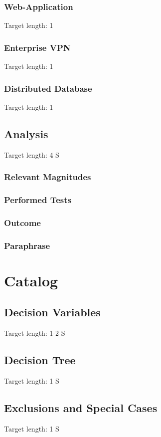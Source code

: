 \documentclass[MSC,Master,english]{twbook}%
\begin{document}
\subsection{Web-Application}
Target length: 1
\subsection{Enterprise VPN}
Target length: 1
\subsection{Distributed Database}
Target length: 1

\section{Analysis}
Target length: 4 S
\subsection{Relevant Magnitudes}
\subsection{Performed Tests}
\subsection{Outcome}
\subsection{Paraphrase}



\chapter{Catalog}
\label{chap:catalog}

\section{Decision Variables}
\label{sec:variables}
Target length: 1-2 S

\section{Decision Tree}
\label{sec:tree}
Target length: 1 S

\section{Exclusions and Special Cases}
\label{sec:exclusions}
Target length: 1 S
\end{document}
